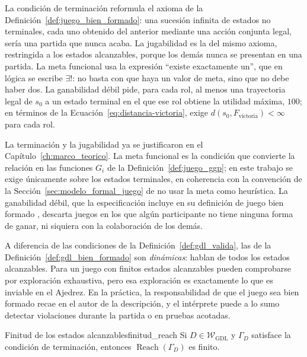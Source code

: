 La condición de terminación reformula el axioma de la Definición~\ref{def:juego_bien_formado}: una sucesión infinita de estados no terminales, cada uno obtenido del anterior mediante una acción conjunta legal, sería una partida que nunca acaba. La jugabilidad es la del mismo axioma, restringida a los estados alcanzables, porque los demás nunca se presentan en una partida. La meta funcional usa la expresión ``existe exactamente un'', que en lógica se escribe $\exists!$: no basta con que haya un valor de meta, sino que no debe haber dos. La ganabilidad débil pide, para cada rol, al menos una trayectoria legal de $s_0$ a un estado terminal en el que ese rol obtiene la utilidad máxima, $100$; en términos de la Ecuación~\eqref{eq:distancia-victoria}, exige $d(s_0, F_{\text{victoria}}) < \infty$ para cada rol.

La terminación y la jugabilidad ya se justificaron en el Capítulo~\ref{ch:marco_teorico}. La meta funcional es la condición que convierte la relación  en las funciones $G_i$ de la Definición~\ref{def:juego_ggp}; en este trabajo se exige únicamente sobre los estados terminales, en coherencia con la convención de la Sección~\ref{sec:modelo_formal_juego} de no usar la meta como heurística. La ganabilidad débil, que la especificación incluye en su definición de juego bien formado \cite{Love2008GDL}, descarta juegos en los que algún participante no tiene ninguna forma de ganar, ni siquiera con la colaboración de los demás.

A diferencia de las condiciones de la Definición~\ref{def:gdl_valida}, las de la Definición~\ref{def:gdl_bien_formado} son \emph{dinámicas}: hablan de todos los estados alcanzables. Para un juego con finitos estados alcanzables pueden comprobarse por exploración exhaustiva, pero esa exploración es exactamente lo que es inviable en el Ajedrez. En la práctica, la responsabilidad de que el juego sea bien formado recae en el autor de la descripción, y el intérprete puede a lo sumo detectar violaciones durante la partida o en pruebas acotadas.

\begin{proposicion}{Finitud de los estados alcanzables}{finitud_reach}
Si $D \in \mathcal W_{\mathrm{GDL}}$ y $\Gamma_D$ satisface la condición de terminación, entonces $\operatorname{Reach}(\Gamma_D)$ es finito.
\end{proposicion}

